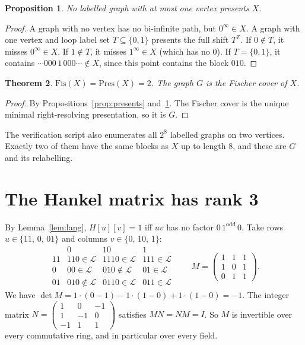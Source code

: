 \documentclass[11pt]{article}
\newtheorem{theorem}{Theorem}
\newtheorem{proposition}[theorem]{Proposition}
\theoremstyle{definition}
\theoremstyle{remark}
\newcommand{\Lang}{\mathcal{L}}
\begin{document}
\begin{proposition}\label{prop:lower}
No labelled graph with at most one vertex presents $X$.
\end{proposition}
\begin{proof}
A graph with no vertex has no bi-infinite path, but $0^\infty\in X$. A graph
with one vertex and loop label set $T\subseteq\{0,1\}$ presents the full
shift $T^{\mathbb Z}$. If $0\notin T$, it misses $0^\infty\in X$. If $1\notin T$,
it misses $1^\infty\in X$ (which has no $0$). If $T=\{0,1\}$, it contains
$\cdots000\,1\,000\cdots\notin X$, since this point contains the block $010$.
\end{proof}

\begin{theorem}\label{thm:fis}
$\mathrm{Fis}(X)=\mathrm{Pres}(X)=2$. The graph $G$ is the Fischer cover of $X$.
\end{theorem}
\begin{proof}
By Propositions~\ref{prop:presents} and~\ref{prop:lower}. The
Fischer cover is the unique minimal right-resolving presentation, so it is $G$.
\end{proof}
The verification script also enumerates all $2^8$ labelled graphs on two
vertices. Exactly two of them have the same blocks as $X$ up to length $8$, and
these are $G$ and its relabelling.

\section{The Hankel matrix has rank 3}

By Lemma~\ref{lem:lang}, $H[u][v]=1$ iff $uv$ has no factor $0\,1^{\mathrm{odd}}\,0$.
Take rows $u\in\{11,\,0,\,01\}$ and columns $v\in\{0,\,10,\,1\}$:
\[
\begin{array}{c|ccc}
 & 0 & 10 & 1\\\hline
11 & 110\in\Lang & 1110\in\Lang & 111\in\Lang\\
0 & 00\in\Lang & 010\notin\Lang & 01\in\Lang\\
01 & 010\notin\Lang & 0110\in\Lang & 011\in\Lang
\end{array}
\qquad
M=\begin{pmatrix}1&1&1\\1&0&1\\0&1&1\end{pmatrix}.
\]
We have $\det M=1\cdot(0-1)-1\cdot(1-0)+1\cdot(1-0)=-1$. The integer matrix
$N=\left(\begin{smallmatrix}1&0&-1\\1&-1&0\\-1&1&1\end{smallmatrix}\right)$
satisfies $MN=NM=I$. So $M$ is invertible over every commutative ring, and
in particular over every field.
\end{document}
